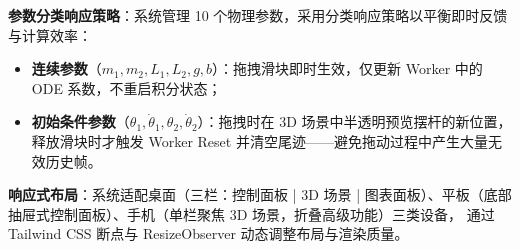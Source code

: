 \textbf{参数分类响应策略}：系统管理 10 个物理参数，采用分类响应策略以平衡即时反馈与计算效率：

\begin{itemize}
  \item \textbf{连续参数}（$m_1, m_2, L_1, L_2, g, b$）：拖拽滑块即时生效，仅更新 Worker 中的 ODE 系数，不重启积分状态；
  \item \textbf{初始条件参数}（$\theta_1, \dot{\theta}_1, \theta_2, \dot{\theta}_2$）：拖拽时在 3D 场景中半透明预览摆杆的新位置，
       释放滑块时才触发 Worker Reset 并清空尾迹——避免拖动过程中产生大量无效历史帧。
\end{itemize}

\textbf{响应式布局}：系统适配桌面（三栏：控制面板 | 3D 场景 | 图表面板）、平板（底部抽屉式控制面板）、手机（单栏聚焦 3D 场景，折叠高级功能）三类设备，
通过 Tailwind CSS 断点与 ResizeObserver 动态调整布局与渲染质量。

\endinput
